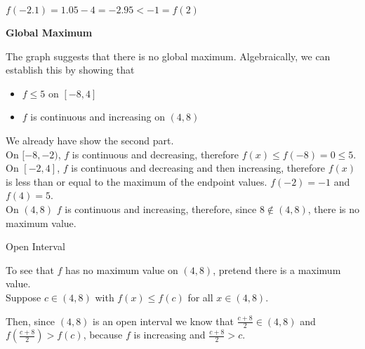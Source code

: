 \documentclass{ximera}
\begin{document}
\begin{exercise}
\begin{question}
\begin{warning}
$f(-2.1) = 1.05 - 4 = -2.95 < -1 = f(2)$


\end{warning}


\end{question}





\begin{question} \textbf{Global Maximum} 






The graph suggests that there is no global maximum. Algebraically, we can establish this by showing that 

\begin{itemize}
\item $f \leq 5$ on $[-8, 4]$ 
\item $f$ is continuous and increasing on $(4, 8)$
\end{itemize}

We already have show the second part. \\



On $[-8, -2)$, $f$ is continuous and decreasing, therefore $f(x) \leq f(-8) = 0 \leq 5$.  \\


On $[-2, 4]$, $f$ is continuous and decreasing and then increasing, therefore $f(x)$ is less than or equal to the maximum of the endpoint values. $f(-2) = -1$ and $f(4) = 5$. \\


On $(4, 8)$ $f$ is continuous and increasing, therefore, since $8 \notin (4, 8)$, there is no maximum value.



\begin{idea} Open Interval

To see that $f$ has no maximum value on $(4, 8)$, pretend there is a maximum value. \\


Suppose $c \in (4, 8)$ with $f(x) \leq f(c)$ for all $x \in (4, 8)$.


Then, since $(4, 8)$ is an open interval we know that $\frac{c+8}{2} \in (4, 8)$ and $f\left( \frac{c+8}{2} \right) > f(c)$, because $f$ is increasing and $\frac{c+8}{2} > c$.







\end{idea}



\end{question}
\end{exercise}
\end{document}
